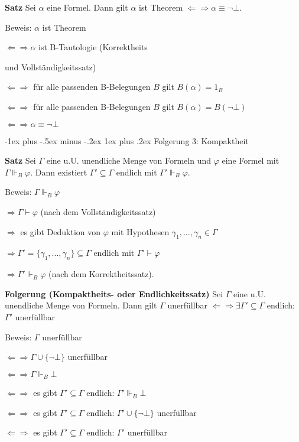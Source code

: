 \documentclass[a4paper]{article}
\makeatletter
\renewcommand{\note}[2]{\begin{noteBox} \textbf{#1} #2 \end{noteBox}}
\renewcommand{\subsubsection}{\@startsection{subsubsection}{3}{0mm}%
                {-1ex plus -.5ex minus -.2ex}%
                {1ex plus .2ex}%
                {\normalfont\small\bfseries}}
\makeatother
\begin{document}
\begin{multicols}{3}
  \note{Satz}{Sei $\alpha$ eine Formel. Dann gilt $\alpha$ ist Theorem $\Leftarrow\Rightarrow\alpha\equiv\lnot\bot$.}

  Beweis: $\alpha$ ist Theorem
  \begin{itemize*}
    \item $\Leftarrow\Rightarrow\alpha$ ist B-Tautologie (Korrektheits\item und Vollständigkeitssatz)
    \item $\Leftarrow\Rightarrow$ für alle passenden B-Belegungen $B$ gilt $B(\alpha) = 1_B$
    \item $\Leftarrow\Rightarrow$ für alle passenden B-Belegungen $B$ gilt $B(\alpha) =B(\lnot\bot)$
    \item $\Leftarrow\Rightarrow\alpha\equiv\lnot\bot$
  \end{itemize*}

  \subsubsection{Folgerung 3: Kompaktheit}
  \note{Satz}{Sei $\Gamma$ eine u.U. unendliche Menge von Formeln und $\varphi$ eine Formel mit $\Gamma\Vdash_B\varphi$. Dann existiert $\Gamma'\subseteq\Gamma$ endlich mit $\Gamma'\Vdash_B \varphi$.}

  Beweis: $\Gamma\Vdash_B\varphi$
  \begin{itemize*}
    \item $\Rightarrow\Gamma\vdash\varphi$ (nach dem Vollständigkeitssatz)
    \item $\Rightarrow$ es gibt Deduktion von $\varphi$ mit Hypothesen $\gamma_1,...,\gamma_n\in\Gamma$
    \item $\Rightarrow\Gamma'=\{\gamma_1,...,\gamma_n\}\subseteq\Gamma$ endlich mit $\Gamma'\vdash\varphi$
    \item $\Rightarrow\Gamma'\Vdash_B\varphi$ (nach dem Korrektheitssatz).
  \end{itemize*}

  \note{Folgerung (Kompaktheits- oder Endlichkeitssatz)}{Sei $\Gamma$ eine u.U. unendliche Menge von Formeln. Dann gilt $\Gamma$ unerfüllbar $\Leftarrow\Rightarrow\exists\Gamma'\subseteq\Gamma$ endlich: $\Gamma'$ unerfüllbar}

  Beweis: $\Gamma$ unerfüllbar
  \begin{itemize*}
    \item $\Leftarrow\Rightarrow\Gamma\cup\{\lnot\bot\}$ unerfüllbar
    \item $\Leftarrow\Rightarrow\Gamma\Vdash_B\bot$
    \item $\Leftarrow\Rightarrow$ es gibt $\Gamma'\subseteq\Gamma$ endlich: $\Gamma'\Vdash_B\bot$
    \item $\Leftarrow\Rightarrow$ es gibt $\Gamma'\subseteq\Gamma$ endlich: $\Gamma'\cup\{\lnot\bot\}$ unerfüllbar
    \item $\Leftarrow\Rightarrow$ es gibt $\Gamma'\subseteq\Gamma$ endlich: $\Gamma'$ unerfüllbar
  \end{itemize*}



\end{multicols}
\end{document}
